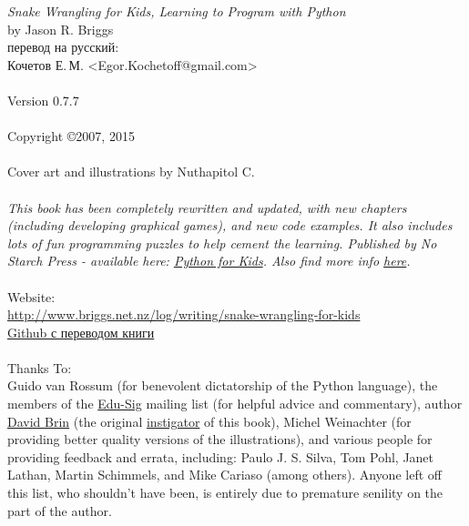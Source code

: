 \noindent
\textsf{\emph{Snake Wrangling for Kids, Learning to Program with Python}}\\
by Jason R. Briggs\\
перевод на русский:\\
Кочетов Е.\,М. <Egor.Kochetoff@gmail.com>\\
\\
Version 0.7.7
\\\\
Copyright \copyright 2007, 2015\\
\\
Cover art and illustrations by Nuthapitol C.\\
\\
\noindent
\textsf{\emph{This book has been completely rewritten and updated, with new chapters (including developing graphical games), and new code examples. It also includes lots of fun programming puzzles to help cement the learning. Published by No Starch Press - available here: \href{http://nostarch.com/pythonforkids}{Python for Kids}. Also find more info \href{http://jasonrbriggs.com/python-for-kids/}{here}.}}
\\
\\
\linebreak
\noindent
Website:\\ \href{http://www.briggs.net.nz/log/writing/snake-wrangling-for-kids}{http://www.briggs.net.nz/log/writing/snake-wrangling-for-kids}\\
\href{https://github.com/gluk47/swfk/tree/master/ru}{Github с переводом книги}\\
\\
\noindent
Thanks To:\\
Guido van Rossum (for benevolent dictatorship of the Python language), the members of the \href{http://www.python.org/community/sigs/current/edu-sig/}{Edu-Sig} mailing list (for helpful advice and commentary), author \href{http://www.davidbrin.com/}{David Brin} (the original \href{http://www.salon.com/tech/feature/2006/09/14/basic/}{instigator} of this book), Michel Weinachter (for providing better quality versions of the illustrations), and various people for providing feedback and errata, including: Paulo J. S. Silva, Tom Pohl, Janet Lathan, Martin Schimmels, and Mike Cariaso (among others).  Anyone left off this list, who shouldn't have been, is entirely due to premature senility on the part of the author.\\

